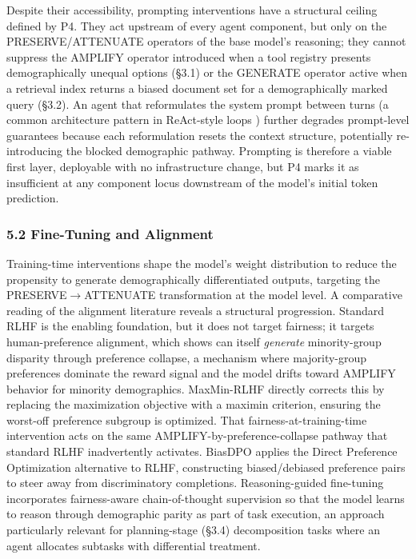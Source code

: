 \documentclass[10pt]{article}
\begin{document}
Despite their accessibility, prompting interventions have a structural ceiling defined by P4. They act upstream of every agent component, but only on the PRESERVE/ATTENUATE operators of the base model's reasoning; they cannot suppress the AMPLIFY operator introduced when a tool registry presents demographically unequal options (\S{}3.1) or the GENERATE operator active when a retrieval index returns a biased document set for a demographically marked query (\S{}3.2). An agent that reformulates the system prompt between turns (a common architecture pattern in ReAct-style loops \cite{yao2023react}) further degrades prompt-level guarantees because each reformulation resets the context structure, potentially re-introducing the blocked demographic pathway. Prompting is therefore a viable first layer, deployable with no infrastructure change, but P4 marks it as insufficient at any component locus downstream of the model's initial token prediction.

\subsubsection*{5.2 Fine-Tuning and Alignment}

Training-time interventions shape the model's weight distribution to reduce the propensity to generate demographically differentiated outputs, targeting the PRESERVE$\rightarrow$ATTENUATE transformation at the model level. A comparative reading of the alignment literature reveals a structural progression. Standard RLHF \cite{ouyang2022training} is the enabling foundation, but it does not target fairness; it targets human-preference alignment, which \cite{xiao2024algorithmic} shows can itself \emph{generate} minority-group disparity through preference collapse, a mechanism where majority-group preferences dominate the reward signal and the model drifts toward AMPLIFY behavior for minority demographics. MaxMin-RLHF \cite{chakraborty2024maxmin} directly corrects this by replacing the maximization objective with a maximin criterion, ensuring the worst-off preference subgroup is optimized. That fairness-at-training-time intervention acts on the same AMPLIFY-by-preference-collapse pathway that standard RLHF inadvertently activates. BiasDPO \cite{allam2024biasdpo} applies the Direct Preference Optimization alternative to RLHF, constructing biased/debiased preference pairs to steer away from discriminatory completions. Reasoning-guided fine-tuning \cite{kabra2025reasoning} incorporates fairness-aware chain-of-thought supervision so that the model learns to reason through demographic parity as part of task execution, an approach particularly relevant for planning-stage (\S{}3.4) decomposition tasks where an agent allocates subtasks with differential treatment.
\end{document}
